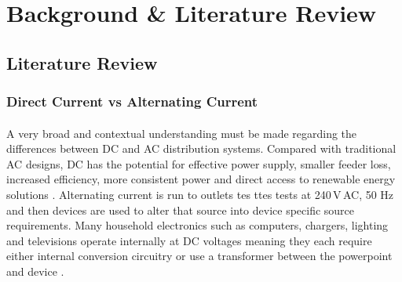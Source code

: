 
\section{Background \& Literature Review}



\subsection{Literature Review}

\subsubsection{Direct Current vs Alternating Current}

\paragraph{}
A very broad and contextual understanding must be made regarding the differences between DC and AC distribution systems. Compared with traditional AC designs, DC has the potential for effective power supply, smaller feeder loss, increased efficiency, more consistent power and direct access to renewable energy solutions \cite{Liu2014}. Alternating current is run to outlets tes ttes tests at 240\,V\,AC, 50 \si{Hz} and then devices are used to alter that source into device specific source requirements. Many household electronics such as computers, chargers, lighting and televisions operate internally at DC voltages meaning they each require either internal conversion circuitry or use a transformer between the powerpoint and device \cite{Paajanen2009}.

